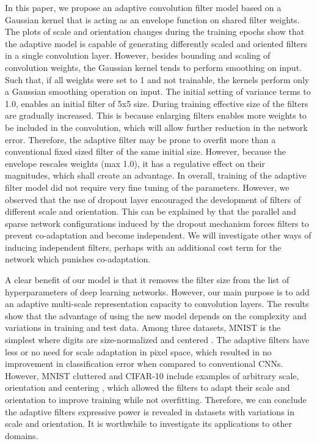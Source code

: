 \documentclass{bmvc2k}
\begin{document}
In this paper, we propose an adaptive convolution filter model based on a Gaussian kernel that is acting as an envelope function on shared filter weights. The plots of scale and orientation changes during the training epochs show that the adaptive model is capable of generating differently scaled and oriented filters in a single convolution layer. However, besides bounding and scaling of convolution weights, the Gaussian kernel tends to perform smoothing on input. Such that, if all weights were set to 1 and not trainable, the kernels perform only a Gaussian smoothing operation on input. The initial setting of variance terms to 1.0, enables an initial filter of 5x5 size. During training effective size of the filters are gradually increased. This is because enlarging filters enables more weights to be included in the convolution, which will allow further reduction in the network error. Therefore, the adaptive filter may be prone to overfit more than a conventional fixed sized filter of the same initial size. However, because the envelope rescales weights (max 1.0), it has a regulative effect on their magnitudes, which shall create an advantage. In overall, training of the adaptive filter model did not require very fine tuning of the parameters. However, we observed that the use of dropout layer encouraged the development of filters of different scale and orientation. This can be explained by that the parallel and sparse network configurations induced by the dropout mechanism forces filters to prevent co-adaptation and become independent. We will investigate other ways of inducing independent filters, perhaps with an additional cost term for the network which punishes co-adaptation.

A clear benefit of our model is that it removes the filter size from the list of hyperparameters of deep learning networks. However, our main purpose is to add an adaptive multi-scale representation capacity to convolution layers. The results show that the advantage of using the new model depends on the complexity and variations in training and test data. Among three datasets, MNIST is the simplest where digits are size-normalized and centered \cite{mnist}. The adaptive filters have less or no need for scale adaptation in pixel space, which resulted in no improvement in classification error when compared to conventional CNNs.
However, MNIST cluttered and CIFAR-10 include examples of arbitrary scale, orientation and centering \cite{cifar10} \cite{mnistcluttered}, which allowed the filters to adapt their scale and orientation to improve training while not overfitting. Therefore, we can conclude the adaptive filters expressive power is revealed in datasets with variations in scale and orientation. It is worthwhile to investigate its applications to other domains.
\end{document}
